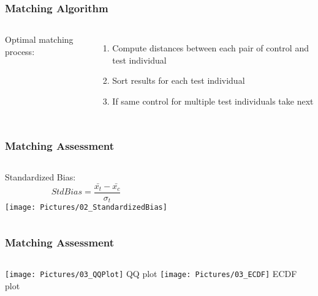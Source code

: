 \documentclass[xcolor=table]{beamer}
\begin{document}

\begin{frame}
	\frametitle{Matching Algorithm}
	\vspace{0.2em}
	\begin{columns}[t]
		Optimal matching process:
		\begin{enumerate}[label=(\roman*)]
			\item Compute distances between each pair of control and test individual
			\item Sort results for each test individual
			\item If same control for multiple test individuals take next
		\end{enumerate}
		\vfill
		\centering
		\vfill
	\end{columns}
\end{frame}


\begin{frame}
	\frametitle{Matching Assessment}
	\begin{columns}[c]
		Standardized Bias:
		\begin{equation}
			Std Bias = \frac{\bar{x_t}-\bar{x_c}}{\sigma _t}
		\end{equation}
		\vfill
		\centering		
		\texttt{[image: Pictures/02\_StandardizedBias]}
		\vfill
	\end{columns}
\end{frame}


\begin{frame}
	\frametitle{Matching Assessment}
	\begin{columns}[c]
		\centering
		\vfill		
		\texttt{[image: Pictures/03\_QQPlot]}
		QQ plot
		\vfill
		\centering
		\vfill
		\texttt{[image: Pictures/03\_ECDF]}
		ECDF plot
		\vfill
	\end{columns}
\end{frame}
\end{document}
